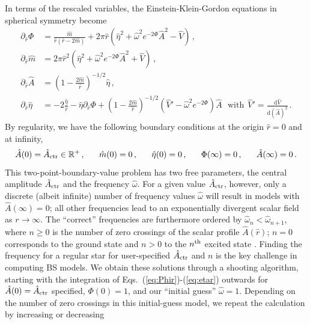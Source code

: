 \documentclass[]{iopart}
\newcommand{\du}{\mathrm{d}}
\begin{document}
%
In terms of the rescaled variables, the Einstein-Klein-Gordon
equations in spherical symmetry become
%
\begin{align}
  \partial_{\hat{r}}\Phi &=
  \frac{\hat{m}}{\hat{r}(\hat{r}-2\hat{m})}
  +
  2\pi \hat{r}
  \left(
  \hat{\eta}^2
  +\hat{\omega}^2e^{-2\Phi}\hat{A}^2
  -\hat{V}
  \right)\,, \label{eq:Phir} \\
  \partial_{\hat{r}}\hat{m} &=
  2\pi \hat{r}^2
  \left(
  \hat{\eta}^2
  +\hat{\omega}^2e^{-2\Phi}\hat{A}^2
  +\hat{V}
  \right)\,,
  \\
  \partial_{\hat{r}}\hat{A} &=
  \left(
  1-\frac{2\hat{m}}{\hat{r}}
  \right)^{-1/2}
  \hat{\eta}\,, \\
  \partial_{\hat{r}} \hat{\eta} &=
  -2\frac{\hat{\eta}}{\hat{r}}
  -\hat{\eta}\partial_{\hat{r}}\Phi
  +\left(
  1-\frac{2\hat{m}}{\hat{r}}
  \right)^{-1/2}
  (\hat{V}'-\hat{\omega}^2e^{-2\Phi})\hat{A}~~~
  \text{with}~~
  \hat{V}'=\frac{\du \hat{V}}{\du (\hat{A})^2}\,.
  \label{eq:etar}
\end{align}
%
By regularity, we have the following boundary conditions at the
origin $\hat{r}=0$ and at infinity,
%
\begin{equation}
  \hat{A}(0) = \hat{A}_{\rm ctr} \in \mathbb{R}^+\,,~~~~~
  \hat{m}(0) = 0\,,~~~~~
  \hat{\eta}(0) = 0\,,~~~~~
  \Phi(\infty) = 0\,,~~~~~
  \hat{A}(\infty) = 0\,.
\end{equation}
%
This two-point-boundary-value problem has two free parameters, the
central amplitude $\hat{A}_{\rm ctr}$ and the frequency $\hat{\omega}$.
For a given value $\hat{A}_{\rm ctr}$, however, only a discrete
(albeit infinite) number of frequency values $\hat{\omega}$ will
result in models with $\hat{A}(\infty)=0$; all other frequencies
lead to an exponentially divergent scalar field as $r\rightarrow
\infty$. The ``correct'' frequencies are furthermore ordered by
$\hat{\omega}_n<\hat{\omega}_{n+1}$, where $n\ge 0$ is the number
of zero crossings of the scalar profile $\hat{A}(\hat{r})$; $n=0$
corresponds to the ground state and $n>0$ to the $n^{\rm th}$ excited
state \cite{Balakrishna:1997ej}.  Finding the frequency for a regular
star for user-specified $\hat{A}_{\rm ctr}$ and $n$ is the key
challenge in computing BS models. We obtain these solutions through
a shooting algorithm, starting with the integration of
Eqs.~(\ref{eq:Phir})-(\ref{eq:etar}) outwards for $\hat{A}(0)=\hat{A}_{\rm
ctr}$ specified, $\Phi(0)=1$, and our ``initial guess'' $\hat{\omega}=1$.
Depending on the number of zero crossings in this initial-guess
model, we repeat the calculation by increasing or decreasing
\end{document}
